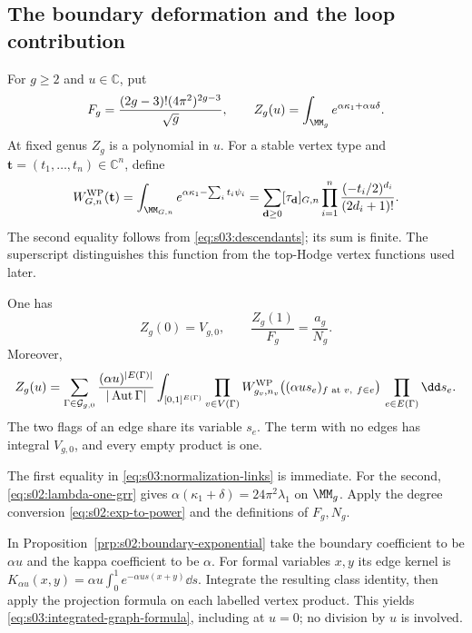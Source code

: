 \subsection{The boundary deformation and the loop contribution}
\label{subsec:s03:02}

For $g\geq2$ and $u\in\mathbb C$, put
\begin{equation}
\label{eq:s03:deformation}
F_g=\frac{(2g-3)!(4\pi^2)^{2g-3}}{\sqrt g},
\qquad
Z_g(u)=\int_{\MM_g}e^{\alpha\kappa_1+\alpha u\delta}.
\end{equation}
At fixed genus $Z_g$ is a polynomial in $u$. For a stable vertex type
and $\mathbf t=(t_1,\ldots,t_n)\in\mathbb C^n$, define
\begin{equation}
\label{eq:s03:vertex-function}
W^{\rm WP}_{G,n}(\mathbf t)
=\int_{\MM_{G,n}}e^{\alpha\kappa_1-\sum_i t_i\psi_i}
=\sum_{\mathbf d\geq0}[\tau_{\mathbf d}]_{G,n}
  \prod_{i=1}^n\frac{(-t_i/2)^{d_i}}{(2d_i+1)!}.
\end{equation}
The second equality follows from \eqref{eq:s03:descendants}; its sum
is finite. The superscript distinguishes this function from the
top-Hodge vertex functions used later.

\begin{lmm}
\label{lmm:s03:exact-deformation}
One has
\begin{equation}
\label{eq:s03:normalization-links}
Z_g(0)=V_{g,0},\qquad
\frac{Z_g(1)}{F_g}=\frac{a_g}{N_g}.
\end{equation}
Moreover,
\begin{equation}
\label{eq:s03:integrated-graph-formula}
Z_g(u)=\sum_{\Gamma\in\mathcal G_{g,0}}
 \frac{(\alpha u)^{|E(\Gamma)|}}{|\operatorname{Aut}\Gamma|}
 \int_{[0,1]^{E(\Gamma)}}
 \prod_{v\in V(\Gamma)}
 W^{\rm WP}_{g_v,n_v}
       \bigl((\alpha u s_e)_{f\text{ at }v,\ f\in e}\bigr)
 \,\prod_{e\in E(\Gamma)}\dd s_e.
\end{equation}
The two flags of an edge share its variable $s_e$. The term with no
edges has integral $V_{g,0}$, and every empty product is one.
\end{lmm}
\begin{prf}
The first equality in \eqref{eq:s03:normalization-links} is immediate.
For the second, \eqref{eq:s02:lambda-one-grr} gives
$\alpha(\kappa_1+\delta)=24\pi^2\lambda_1$ on $\MM_g$.
Apply the degree conversion \eqref{eq:s02:exp-to-power} and the
definitions of $F_g,N_g$.

In Proposition~\ref{prp:s02:boundary-exponential} take the boundary
coefficient to be $\alpha u$ and the kappa coefficient to be $\alpha$.
For formal variables $x,y$ its edge kernel is
$K_{\alpha u}(x,y)=\alpha u\int_0^1e^{-\alpha u s(x+y)}\dd s$.
Integrate the resulting class identity, then apply the projection
formula on each labelled vertex product. This yields
\eqref{eq:s03:integrated-graph-formula}, including at $u=0$; no division
by $u$ is involved.
\end{prf}


